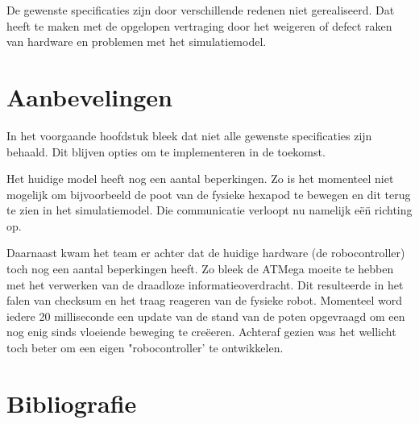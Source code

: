 \documentclass[10pt,a4paper]{article}
\begin{document}
De gewenste specificaties zijn door verschillende redenen niet gerealiseerd. Dat heeft te maken met de opgelopen vertraging door het weigeren of defect raken van hardware en problemen met het simulatiemodel.

\newpage
\section{Aanbevelingen}
In het voorgaande hoofdstuk bleek dat niet alle gewenste specificaties zijn behaald. Dit blijven opties om te implementeren in de toekomst. 

Het huidige model heeft nog een aantal beperkingen. Zo is het momenteel niet mogelijk om bijvoorbeeld de poot van de fysieke hexapod te bewegen en dit terug te zien in het simulatiemodel. Die communicatie verloopt nu namelijk e\"e\"n richting op. 

Daarnaast kwam het team er achter dat de huidige hardware (de robocontroller) toch nog een aantal beperkingen heeft. Zo bleek de ATMega moeite te hebben met het verwerken van de draadloze informatieoverdracht. Dit resulteerde in het falen van checksum en het traag reageren van de fysieke robot. Momenteel word iedere 20 milliseconde een update van de stand van de poten opgevraagd om een nog enig sinds vloeiende beweging te cre\"eeren. Achteraf gezien was het wellicht toch beter om een eigen "robocontroller' te ontwikkelen.

\newpage

\section{Bibliografie}


\end{document}
